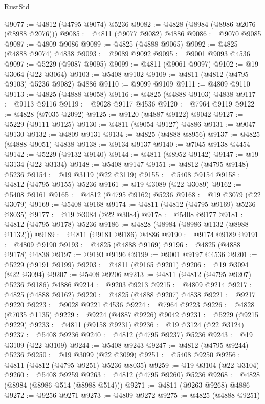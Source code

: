 \begin{lexlean}{RustStd}
\begin{coremodule}
{\begin{coremodule}
{{{{{{{{{{{{{{{{{{{{{{{{{{{{{{{{{{{{{{{{{{{{{{{{{{{{{{{{{{{{{{{{{{{{{{{{{{{{{{{{@9077 := @4812 (@4795 @9074) @5236
@9082 := @4828 (@8984 (@8986 @2076 (@8988 @2076)))
@9085 := @4811 (@9077 @9082) @4886
@9086 := @9070 @9085
@9087 := @4809 @9086
@9089 := @4825 (@4888 @9065)
@9092 := @4825 (@4888 @9074) @4838
@9093 := @9089 @9092
@9095 := @9001 @9093 @4536
@9097 := @5229 (@9087 @9095)
@9099 := @4811 (@9061 @9097)
@9102 := @19 @3064 (@22 @3064)
@9103 := @5408 @9102
@9109 := @4811 (@4812 (@4795 @9103) @5236 @9082) @4886
@9110 := @9099 @9109
@9111 := @4809 @9110
@9113 := @4825 (@4888 @9058)
@9116 := @4825 (@4888 @9103) @4838
@9117 := @9113 @9116
@9119 := @9028 @9117 @4536
@9120 := @7964 @9119
@9122 := @4828 (@7035 @2092)
@9125 := @9120 (@4887 @9122) @9042
@9127 := @5229 (@9111 @9125)
@9130 := @4811 (@9054 @9127) @4886
@9131 := @9047 @9130
@9132 := @4809 @9131
@9134 := @4825 (@4888 @8956)
@9137 := @4825 (@4888 @9051) @4838
@9138 := @9134 @9137
@9140 := @7045 @9138 @4454
@9142 := @5229 (@9132 @9140)
@9144 := @4811 (@8952 @9142)
@9147 := @19 @3134 (@22 @3134)
@9148 := @5408 @9147
@9151 := @4812 (@4795 @9148) @5236
@9154 := @19 @3119 (@22 @3119)
@9155 := @5408 @9154
@9158 := @4812 (@4795 @9155) @5236
@9161 := @19 @3089 (@22 @3089)
@9162 := @5408 @9161
@9165 := @4812 (@4795 @9162) @5236
@9168 := @19 @3079 (@22 @3079)
@9169 := @5408 @9168
@9174 := @4811 (@4812 (@4795 @9169) @5236 @8035)
@9177 := @19 @3084 (@22 @3084)
@9178 := @5408 @9177
@9181 := @4812 (@4795 @9178) @5236
@9186 := @4828 (@8984 (@8986 @1132 (@8988 @1132)))
@9189 := @4811 (@9181 @9186) @4886
@9190 := @9174 @9189
@9191 := @4809 @9190
@9193 := @4825 (@4888 @9169)
@9196 := @4825 (@4888 @9178) @4838
@9197 := @9193 @9196
@9199 := @9001 @9197 @4536
@9201 := @5229 (@9191 @9199)
@9203 := @4811 (@9165 @9201)
@9206 := @19 @3094 (@22 @3094)
@9207 := @5408 @9206
@9213 := @4811 (@4812 (@4795 @9207) @5236 @9186) @4886
@9214 := @9203 @9213
@9215 := @4809 @9214
@9217 := @4825 (@4888 @9162)
@9220 := @4825 (@4888 @9207) @4838
@9221 := @9217 @9220
@9223 := @9028 @9221 @4536
@9224 := @7964 @9223
@9226 := @4828 (@7035 @1135)
@9229 := @9224 (@4887 @9226) @9042
@9231 := @5229 (@9215 @9229)
@9233 := @4811 (@9158 @9231)
@9236 := @19 @3124 (@22 @3124)
@9237 := @5408 @9236
@9240 := @4812 (@4795 @9237) @5236
@9243 := @19 @3109 (@22 @3109)
@9244 := @5408 @9243
@9247 := @4812 (@4795 @9244) @5236
@9250 := @19 @3099 (@22 @3099)
@9251 := @5408 @9250
@9256 := @4811 (@4812 (@4795 @9251) @5236 @8035)
@9259 := @19 @3104 (@22 @3104)
@9260 := @5408 @9259
@9263 := @4812 (@4795 @9260) @5236
@9268 := @4828 (@8984 (@8986 @514 (@8988 @514)))
@9271 := @4811 (@9263 @9268) @4886
@9272 := @9256 @9271
@9273 := @4809 @9272
@9275 := @4825 (@4888 @9251)
}}}}}}}}}}}}}}}}}}}}}}}}}}}}}}}}}}}}}}}}}}}}}}}}}}}}}}}}}}}}}}}}}}}}}}}}}}}}}}}}
\end{coremodule}}
\end{coremodule}
\end{lexlean}
